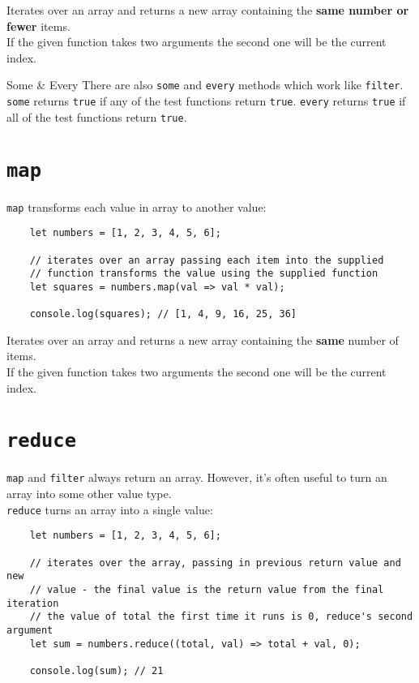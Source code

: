 Iterates over an array and returns a new array containing the \textbf{same number or fewer} items.
\\

If the given function takes two arguments the second one will be the current index.
\\

\begin{infobox}{Some \& Every}
    There are also \texttt{some} and \texttt{every} methods which work like \texttt{filter}. \texttt{some} returns \texttt{true} if any of the test functions return \texttt{true}. \texttt{every} returns \texttt{true} if all of the test functions return \texttt{true}.
\end{infobox}



\section{\texttt{map}}

\texttt{map} transforms each value in array to another value:

\begin{verbatim}
    let numbers = [1, 2, 3, 4, 5, 6];

    // iterates over an array passing each item into the supplied
    // function transforms the value using the supplied function
    let squares = numbers.map(val => val * val);

    console.log(squares); // [1, 4, 9, 16, 25, 36]
\end{verbatim}

Iterates over an array and returns a new array containing the \textbf{same} number of items.
\\

If the given function takes two arguments the second one will be the current index.



\section{\texttt{reduce}}

\texttt{map} and \texttt{filter} always return an array. However, it's often useful to turn an array into some other value type.
\\

\texttt{reduce} turns an array into a single value:

\begin{verbatim}
    let numbers = [1, 2, 3, 4, 5, 6];

    // iterates over the array, passing in previous return value and new
    // value - the final value is the return value from the final iteration
    // the value of total the first time it runs is 0, reduce's second argument
    let sum = numbers.reduce((total, val) => total + val, 0);

    console.log(sum); // 21
\end{verbatim}

